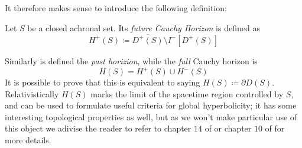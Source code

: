 It therefore makes sense to introduce the following definition:
\begin{definition}
	Let \(S\) be a closed achronal set. Its \emph{future Cauchy Horizon} is defined as 
	\[
	H^+(S) \coloneqq \overline{D^+(S)} \setminus I^-[D^+(S)]	
	\]
\end{definition}
	Similarly is defined the \emph{past horizion}, while the \emph{full} Cauchy horizon is
	\[
	H(S) = 	H^+(S) \cup H^-(S)
	\]
	It is possible to prove that this is equivalent to saying \(H(S) \coloneqq \partial D(S)\). Relativistically \(H(S)\) marks the limit of the spacetime region controlled by \(S\), and can be used to formulate useful criteria for global hyperbolicity; it has some interesting topological properties as well, but as we won't make particular use of this object we adivise the reader to refer to chapter \(14\) of \cite{o1983semi} or chapter \(10\) of \cite{wald2010general} for more details.

	